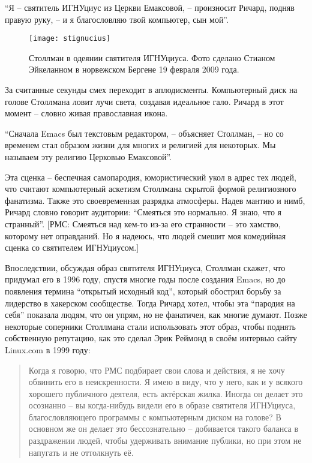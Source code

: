 \enquote{Я -- святитель ИГНУциус из Церкви Емаксовой, -- произносит Ричард, подняв правую руку, -- и я благословляю твой компьютер, сын мой}.

\begin{figure}[ht] \centering
  \texttt{[image: stignucius]}
  \caption{Столлман в одеянии святителя ИГНУциуса. Фото сделано Стианом Эйкеланном в норвежском Бергене 19 февраля 2009 года.}
\end{figure}

За считанные секунды смех переходит в аплодисменты. Компьютерный диск на голове Столлмана ловит лучи света, создавая идеальное гало. Ричард в этот момент -- словно живая православная икона.

\enquote{Сначала Emacs был текстовым редактором, -- объясняет Столлман, -- но со временем стал образом жизни для многих и религией для некоторых. Мы называем эту религию Церковью Емаксовой}.

Эта сценка -- беспечная самопародия, юмористический укол в адрес тех людей, что считают компьютерный аскетизм Столлмана скрытой формой религиозного фанатизма. Также это своевременная разрядка атмосферы. Надев мантию и нимб, Ричард словно говорит аудитории: \enquote{Смеяться это нормально. Я знаю, что я странный}.  [РМС: Смеяться над кем-то из-за его странности -- это хамство, которому нет оправданий. Но я надеюсь, что людей смешит моя комедийная сценка со святителем ИГНУциусом.]

Впоследствии, обсуждая образ святителя ИГНУциуса, Столлман скажет, что придумал его в 1996 году, спустя многие годы после создания Emacs, но до появления термина \enquote{открытый исходный код}, который обострил борьбу за лидерство в хакерском сообществе. Тогда Ричард хотел, чтобы эта \enquote{пародия на себя} показала людям, что он упрям, но не фанатичен, как многие думают. Позже некоторые соперники Столлмана стали использовать этот образ, чтобы поднять собственную репутацию, как это сделал Эрик Реймонд в своём интервью сайту Linux.com в 1999 году:

\begin{quote}
Когда я говорю, что РМС подбирает свои слова и действия, я не хочу обвинить его в неискренности. Я имею в виду, что у него, как и у всякого хорошего публичного деятеля, есть актёрская жилка. Иногда он делает это осознанно -- вы когда-нибудь видели его в образе святителя ИГНУциуса, благословляющего программы с компьютерным диском на голове? В основном же он делает это бессознательно -- добивается такого баланса в раздражении людей, чтобы удерживать внимание публики, но при этом не напугать и не оттолкнуть её. 
\end{quote}

